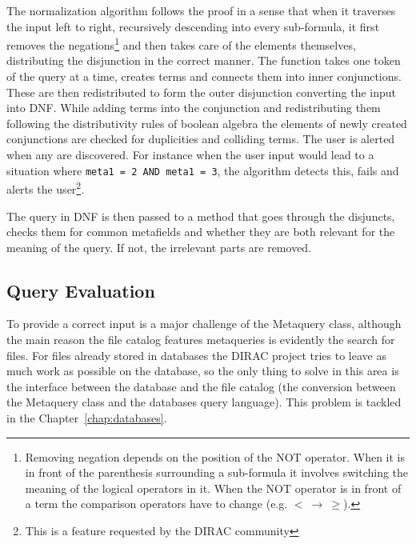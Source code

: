 The normalization algorithm follows the proof in a sense that when it traverses the input left to right, 
recursively descending into every sub-formula, it first removes the negations\footnote{Removing negation depends on 
the position of the NOT operator. When it is in front of the parenthesis surrounding a sub-formula it involves 
switching the meaning of the logical operators in it. When the NOT operator is in front of a term the comparison 
operators have to change (e.g. $ < \: \rightarrow \: \geq$).} 
and then takes care of the elements themselves, distributing the disjunction in the correct manner. %
The function takes one token of the query at a time, creates terms and connects them into inner conjunctions. 
These are then redistributed to form the outer disjunction converting the input into DNF. 
While adding terms into the conjunction and redistributing them following the distributivity rules of boolean algebra 
the elements of newly created conjunctions are checked for duplicities and colliding terms. The user is alerted 
when any are discovered. For instance when the user input would lead to a situation where 
\texttt{meta1 = 2 AND meta1 = 3}, the algorithm detects this, fails and alerts the 
user\footnote{This is a feature requested by the DIRAC community}. 


The query in DNF is then passed to a method that goes through the disjuncts, checks them for common metafields 
and whether they are both relevant for the meaning of the query. If not, the irrelevant parts are removed. %

\subsection{Query Evaluation}

To provide a correct input is a major challenge of the Metaquery class, although the main reason the file
catalog features metaqueries is evidently the search for files. For files already stored in databases the DIRAC
project tries to leave as much work as possible on the database, so the only thing to solve in this area is the 
interface between the database and the file catalog (the conversion between the Metaquery class and the databases
query language). This problem is tackled in the Chapter~\ref{chap:databases}. 


